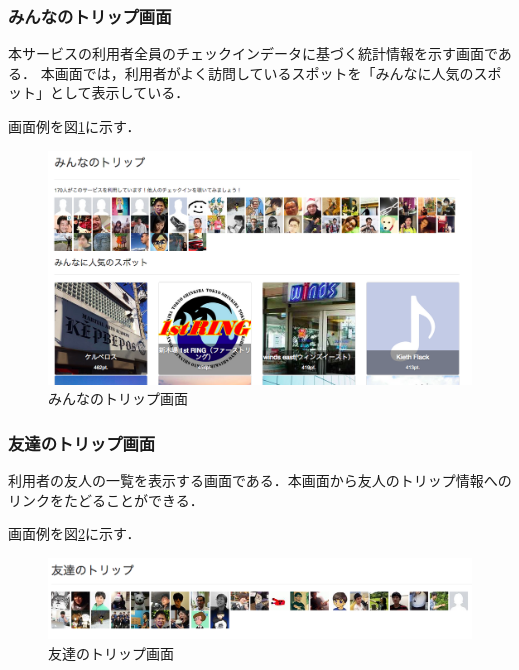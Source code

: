 \documentclass{jsarticle}
\begin{document}
\subsubsection{みんなのトリップ画面}

本サービスの利用者全員のチェックインデータに基づく統計情報を示す画面である．
本画面では，利用者がよく訪問しているスポットを「みんなに人気のスポット」として表示している．

画面例を図\ref{cheekitrip_everyone}に示す．


\begin{figure}[!ht]
\begin{center}
\includegraphics[width=12.0cm]{./image/cheekitrip_everyone.png}
\caption{みんなのトリップ画面}
\label{cheekitrip_everyone}
\end{center}
\end{figure}

\subsubsection{友達のトリップ画面}

利用者の友人の一覧を表示する画面である．本画面から友人のトリップ情報へのリンクをたどることができる．

画面例を図\ref{cheekitrip_friends}に示す．

\begin{figure}[!ht]
\begin{center}
\includegraphics[width=12.0cm]{./image/cheekitrip_friends.png}
\caption{友達のトリップ画面}
\label{cheekitrip_friends}
\end{center}
\end{figure}
\end{document}

